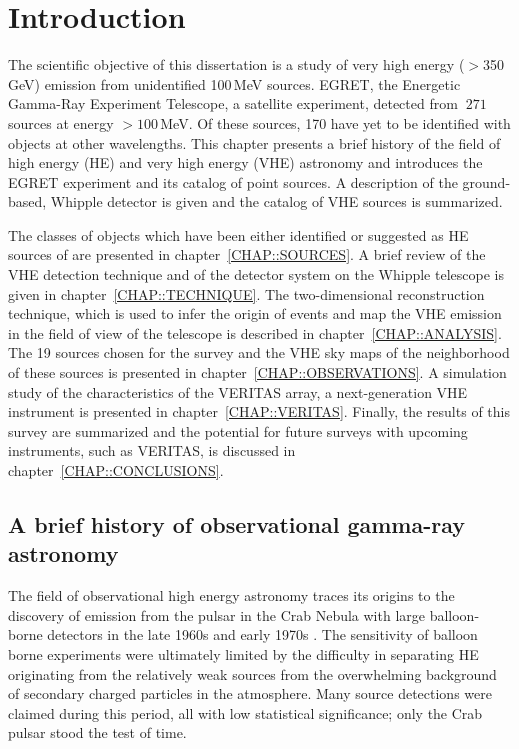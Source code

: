 \chapter{Introduction}
\label{CHAP::INTRODUCTION}

The scientific objective of this dissertation is a study of very high
energy ($>$350\,GeV) \Gray emission from unidentified 100\,MeV
sources.  EGRET, the Energetic Gamma-Ray Experiment Telescope, a
satellite experiment, detected \Grays from $~271$ sources at energy
$>100$\,MeV. Of these sources, 170 have yet to be identified with
objects at other wavelengths. This chapter presents a brief history of
the field of high energy (HE) and very high energy (VHE)
\Gray astronomy and introduces the EGRET experiment and its catalog of
point sources. A description of the ground-based, Whipple \Gray
detector is given and the catalog of VHE sources is summarized.

The classes of objects which have been either identified or suggested
as HE sources of \Grays are presented in
chapter~\ref{CHAP::SOURCES}. A brief review of the VHE \Gray detection
technique and of the detector system on the Whipple telescope is given
in chapter~\ref{CHAP::TECHNIQUE}. The two-dimensional reconstruction
technique, which is used to infer the origin of \Gray events and map
the VHE emission in the field of view of the telescope is described in
chapter~\ref{CHAP::ANALYSIS}. The 19 sources chosen for the survey and
the VHE sky maps of the neighborhood of these sources is presented in
chapter~\ref{CHAP::OBSERVATIONS}. A simulation study of the
characteristics of the VERITAS array, a next-generation VHE \Gray
instrument is presented in chapter~\ref{CHAP::VERITAS}. Finally, the
results of this survey are summarized and the potential for future
surveys with upcoming \Gray instruments, such as VERITAS, is discussed
in chapter~\ref{CHAP::CONCLUSIONS}.

\section{A brief history of observational gamma-ray astronomy}
\label{SEC::INTRODUCTION::HISTORY}

The field of observational high energy \Gray astronomy traces its
origins to the discovery of emission from the pulsar in the Crab
Nebula with large balloon-borne detectors in the late 1960s and early
1970s \citep[see for example][]{REF::BROWNING::NATURE1971,
REF::ALBATS::NATURE1972, REF::PARLIER::NPS1973,
REF::MCBREEN::APJ1973}. The sensitivity of balloon borne experiments
were ultimately limited by the difficulty in separating HE \Grays
originating from the relatively weak
\Gray sources from the overwhelming background of secondary charged
particles in the atmosphere. Many source detections were claimed
during this period, all with low statistical significance; only the
Crab pulsar stood the test of time.

